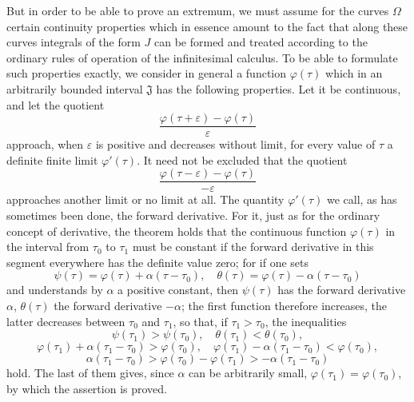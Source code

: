 \documentclass[11pt,a4paper,leqno]{article}
\begin{document}
But in order to be able to prove an extremum, we must assume for the curves $\Omega$ certain continuity properties
which in essence amount to the fact that along these curves integrals of the form $J$ can be formed and treated according to the ordinary rules of operation of the infinitesimal calculus. To be able to formulate such properties exactly, we consider in general a function $\varphi(\tau)$ which in an arbitrarily bounded interval $\mathfrak{J}$ has the following properties. Let it be continuous, and let the quotient
\[
\frac{\varphi(\tau+\varepsilon)-\varphi(\tau)}{\varepsilon}
\]
approach, when $\varepsilon$ is positive and decreases without limit, for every value of $\tau$ a definite finite limit $\varphi'(\tau)$. It need not be excluded that the quotient
\[
\frac{\varphi(\tau-\varepsilon)-\varphi(\tau)}{-\varepsilon}
\]
approaches another limit or no limit at all. The quantity $\varphi'(\tau)$ we call, as has sometimes been done, the forward derivative. For it, just as for the ordinary concept of derivative, the theorem holds that the continuous function $\varphi(\tau)$ in the interval from $\tau_0$ to $\tau_1$ must be constant if the forward derivative in this segment everywhere has the definite value zero; for if one sets
\[
\psi(\tau)=\varphi(\tau)+\alpha(\tau-\tau_0),
\quad \theta(\tau)=\varphi(\tau)-\alpha(\tau-\tau_0)
\]
and understands by $\alpha$ a positive constant, then $\psi(\tau)$ has the forward derivative $\alpha$, $\theta(\tau)$ the forward derivative $-\alpha$; the first function therefore increases, the latter decreases between $\tau_0$ and $\tau_1$, so that, if $\tau_1>\tau_0$, the inequalities
\[
\psi(\tau_1)>\psi(\tau_0),
\quad \theta(\tau_1)<\theta(\tau_0),
\]
\[
\varphi(\tau_1)+\alpha(\tau_1-\tau_0)>\varphi(\tau_0),
\quad \varphi(\tau_1)-\alpha(\tau_1-\tau_0)<\varphi(\tau_0),
\]
\[
\alpha(\tau_1-\tau_0)>\varphi(\tau_0)-\varphi(\tau_1)>-\alpha(\tau_1-\tau_0)
\]
hold. The last of them gives, since $\alpha$ can be arbitrarily small, $\varphi(\tau_1)=\varphi(\tau_0)$, by which the assertion is proved.
\end{document}
